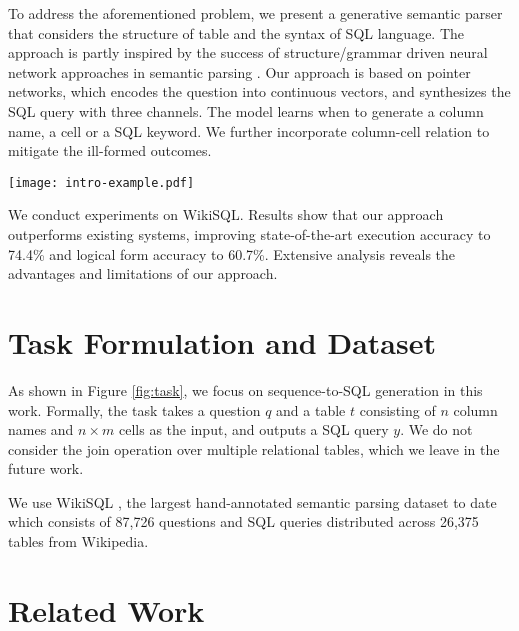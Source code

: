 \documentclass[11pt,a4paper]{article}
\begin{document}
To address the aforementioned problem, we present a generative semantic parser that considers the structure of table and the syntax of SQL language.
The approach is partly inspired by the success of structure/grammar driven neural network approaches in semantic parsing \cite{xiao-dymetman-gardent:2016:P16-1,krishnamurthy-dasigi-gardner:2017:EMNLP2017}.
Our approach is based on pointer networks, which encodes the question into continuous vectors, and synthesizes the SQL query
with three channels. The model learns when to generate a column name, a cell or a SQL keyword.
We further incorporate column-cell relation 
to mitigate the ill-formed outcomes.


\begin{figure*}[t]
	\centering
	\texttt{[image: intro-example.pdf]}	\caption{An brief illustration of the task. The focus of this work is sequence-to-SQL generation.}
	\label{fig:task}
\end{figure*}
We conduct experiments on WikiSQL.
Results show that our approach outperforms existing systems,
improving state-of-the-art execution accuracy to 74.4\%
and logical form accuracy to 60.7\%.
Extensive analysis reveals the advantages and limitations of our approach.











\section{Task Formulation and Dataset}
As shown in Figure \ref{fig:task}, we 
focus on sequence-to-SQL generation in this work. 
Formally, the task takes a question $q$ and a table $t$ consisting of $n$ column names and $n \times m$ cells as the input, and outputs a SQL query $y$.
We do not consider the join operation over multiple relational tables, which we leave in the future work.


We use WikiSQL \cite{zhong2017seq2sql}, the largest hand-annotated semantic parsing dataset to date which 
consists of 87,726 questions and SQL queries distributed across 26,375 tables from Wikipedia.








\section{Related Work}
\end{document}
